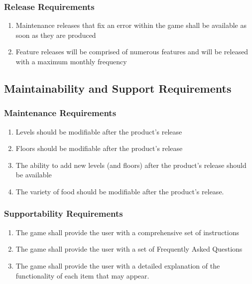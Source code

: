 \documentclass[12pt, titlepage]{article}
\begin{document}
\subsubsection{Release Requirements}
\label{ssub:release_requirements}
\begin{enumerate}[{OE}1. ]
        \item Maintenance releases that fix an error within the game shall be available as soon as they are produced
        \item Feature releases will be comprised of numerous features and will be released with a maximum monthly frequency
\end{enumerate}


\subsection{Maintainability and Support Requirements}
\label{sub:maintainability_and_support_requirements}

\subsubsection{Maintenance Requirements}
\label{ssub:maintenance_requirements}
\begin{enumerate}[{MS}1. ]
        \item Levels should be modifiable after the product's release
        \item Floors should be modifiable after the product's release
        \item The ability to add new levels (and floors) after the product's release should be available
        \item The variety of food should be modifiable after the product's release.
\end{enumerate}

\subsubsection{Supportability Requirements}
\label{ssub:supportability_requirements}
\begin{enumerate}[start=5,label={ MS\arabic*.}]
        \item The game shall provide the user with a comprehensive set of instructions
        \item The game shall provide the user with a set of Frequently Asked Questions
        \item The game shall provide the user with a detailed explanation of the functionality of each item that may appear.
\end{enumerate}
\end{document}
